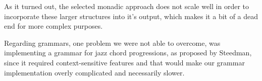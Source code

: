 \documentclass[11pt,a4paper]{article}
\begin{document}
As it turned out, the selected monadic approach does not scale well in order to incorporate these larger structures into it's output, which makes it a bit of a dead end for more complex purposes.

Regarding grammars, one problem we were not able to overcome, was implementing a grammar for jazz chord progressions, as proposed by Steedman\cite{jazzchords}, since it required context-sensitive features and that would make our grammar implementation overly complicated and necessarily slower.\\

\newpage


\end{document}
